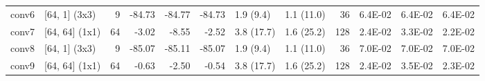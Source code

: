 \begin{table}
\begin{tabular}{llrrrrllrrrr}
conv6 & [64, 1] (3x3) & 9 & {\cellcolor[HTML]{A50026}} \color[HTML]{F1F1F1} -84.73 & {\cellcolor[HTML]{A50026}} \color[HTML]{F1F1F1} -84.77 & {\cellcolor[HTML]{A50026}} \color[HTML]{F1F1F1} -84.73 & 1.9 (9.4) & 1.1 (11.0) & 36 & {\cellcolor[HTML]{C21C27}} \color[HTML]{F1F1F1} 6.4E-02 & {\cellcolor[HTML]{C21C27}} \color[HTML]{F1F1F1} 6.4E-02 & {\cellcolor[HTML]{C21C27}} \color[HTML]{F1F1F1} 6.4E-02 \\
conv7 & [64, 64] (1x1) & 64 & {\cellcolor[HTML]{EFF8AA}} \color[HTML]{000000} -3.02 & {\cellcolor[HTML]{FEFFBE}} \color[HTML]{000000} -8.55 & {\cellcolor[HTML]{EFF8AA}} \color[HTML]{000000} -2.52 & 3.8 (17.7) & 1.6 (25.2) & 128 & {\cellcolor[HTML]{FFF1A8}} \color[HTML]{000000} 2.4E-02 & {\cellcolor[HTML]{FED07E}} \color[HTML]{000000} 3.3E-02 & {\cellcolor[HTML]{FFF7B2}} \color[HTML]{000000} 2.2E-02 \\
conv8 & [64, 1] (3x3) & 9 & {\cellcolor[HTML]{A50026}} \color[HTML]{F1F1F1} -85.07 & {\cellcolor[HTML]{A50026}} \color[HTML]{F1F1F1} -85.11 & {\cellcolor[HTML]{A50026}} \color[HTML]{F1F1F1} -85.07 & 1.9 (9.4) & 1.1 (11.0) & 36 & {\cellcolor[HTML]{A50026}} \color[HTML]{F1F1F1} 7.0E-02 & {\cellcolor[HTML]{A50026}} \color[HTML]{F1F1F1} 7.0E-02 & {\cellcolor[HTML]{A50026}} \color[HTML]{F1F1F1} 7.0E-02 \\
conv9 & [64, 64] (1x1) & 64 & {\cellcolor[HTML]{E9F6A1}} \color[HTML]{000000} -0.63 & {\cellcolor[HTML]{EFF8AA}} \color[HTML]{000000} -2.50 & {\cellcolor[HTML]{E9F6A1}} \color[HTML]{000000} -0.54 & 3.8 (17.7) & 1.6 (25.2) & 128 & {\cellcolor[HTML]{FFF0A6}} \color[HTML]{000000} 2.4E-02 & {\cellcolor[HTML]{FEC877}} \color[HTML]{000000} 3.5E-02 & {\cellcolor[HTML]{FFF5AE}} \color[HTML]{000000} 2.3E-02 \\
\bottomrule
\end{tabular}
\end{table}
